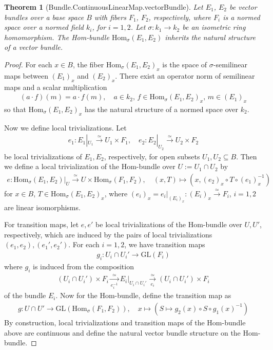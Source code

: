 \documentclass{article}
\newtheorem{theorem}{Theorem}
\begin{document}
\begin{theorem}[Bundle.ContinuousLinearMap.vectorBundle]
     Let $E_1$, $E_2$ be vector bundles over a base space $B$ with fibers $F_1$, $F_2$, respectively, where $F_i$ is a normed space over a normed field $k_i$, for $i=1,2$. Let $\sigma: k_1 \to k_2$ be an isometric ring homomorphism. The Hom-bundle $\text{Hom}_\sigma (E_1,E_2)$ inherits the natural structure of a vector bundle.
\end{theorem}
\begin{proof}
    For each $x \in B$, the fiber $\text{Hom}_\sigma(E_1,E_2)_x$ is the space of $\sigma$-semilinear maps between $(E_1)_x$ and $(E_2)_x$. There exist an operator norm of semilinear maps and a scalar multiplication
    \begin{align*}
        (a \cdot f)(m) = a \cdot f(m), \quad a \in k_2,\, f \in \text{Hom}_\sigma(E_1,E_2)_x, \,m \in (E_1)_x
    \end{align*}
    so that $\text{Hom}_\sigma(E_1,E_2)_x$ has the natural structure of a normed space over $k_2$.

    Now we define local trivializations. Let 
    \begin{align*}
        e_1:E_1|_{U_1} \xrightarrow{\simeq} U_1 \times F_1, \quad e_2: E_2|_{U_2} \xrightarrow{\simeq} U_2 \times F_2
    \end{align*}
    be local trivializations of $E_1,E_2$, respectively, for open subsets $U_1,U_2 \subseteq B$. Then we define a local trivialization of the Hom-bundle over $U:= U_1 \cap U_2$ by
    \begin{align*}
        e: \text{Hom}_\sigma(E_1,E_2)|_U \xrightarrow{\simeq} U \times \text{Hom}_\sigma(F_1,F_2), \quad (x,T) \mapsto (x,(e_2)_x \circ T \circ (e_1)_x^{-1})
    \end{align*}
    for $x \in B$, $T \in \text{Hom}_\sigma(E_1,E_2)_x$, where $(e_i)_x=e_i|_{(E_i)_x}: (E_i)_x \xrightarrow{\simeq} F_i$, $i=1,2$ are linear isomorphisms. 

    For transition maps, let $e,e'$ be local trivializations of the Hom-bundle over $U,U'$, respectively, which are induced by the pairs of local trivializations $(e_1,e_2),(e_1',e_2')$. For each $i=1,2$, we have transition maps
    \begin{align*}
        g_i: U_i \cap U_i' \to \text{GL}(F_i)
    \end{align*} 
    where $g_i$ is induced from the composition
    \begin{align*}
        (U_i \cap U_i') \times F_i \xrightarrow[e_i^{-1}]{\simeq} E_i|_{U_i \cap U_i'} \xrightarrow[e_i]{\simeq} (U_i \cap U_i') \times F_i
    \end{align*}
    of the bundle $E_i$. Now for the Hom-bundle, define the transition map as
    \begin{align*}
        g: U \cap U' \to \text{GL}(\text{Hom}_\sigma(F_1,F_2)), \quad x \mapsto (S \mapsto g_2(x) \circ S \circ g_1(x)^{-1})
    \end{align*}
    By construction, local trivializations and transition maps of the Hom-bundle above are continuous and define the natural vector bundle structure on the Hom-bundle.
\end{proof}
\end{document}
